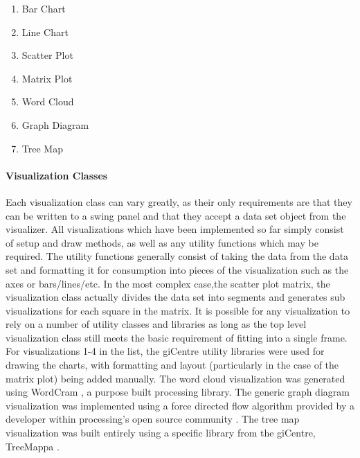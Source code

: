 	\begin{enumerate}
		\item{Bar Chart}
		\item{Line Chart}
		\item{Scatter Plot}
		\item{Matrix Plot}
		\item{Word Cloud}
		\item{Graph Diagram}
		\item{Tree Map}
	\end{enumerate}


\paragraph{Visualization Classes}
Each visualization class can vary greatly, as their only requirements are that they can be written to a swing panel and that they accept a data set object from the visualizer. All visualizations which have been implemented so far simply consist of setup and draw methods, as well as any utility functions which may be required. The utility functions generally consist of taking the data from the data set and formatting it for consumption into pieces of the visualization such as the axes or bars/lines/etc. In the most complex case,the scatter plot matrix, the visualization class actually divides the data set into segments and generates sub visualizations for each square in the matrix. It is possible for any visualization to rely on a number of utility classes and libraries as long as the top level visualization class still meets the basic requirement of fitting into a single frame. For visualizations 1-4 in the list, the giCentre utility libraries \citep{CityUniversityLondon2013} were used for drawing the charts, with formatting and layout (particularly in the case of the matrix plot) being added manually. The word cloud visualization was generated using WordCram \citep{Bernier2015}, a purpose built processing library. The generic graph diagram visualization was implemented using a force directed flow algorithm provided by a developer within processing's open source community \citep{Kamermans2011}. The tree map visualization was built entirely using a specific library from the giCentre, TreeMappa \citep{CityUniversityLondon2010}.


